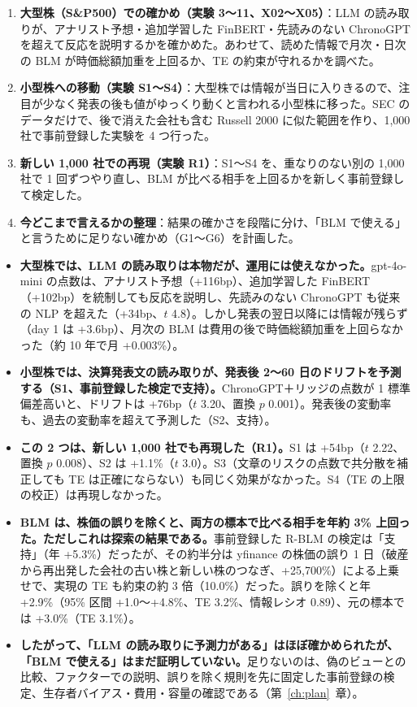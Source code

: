 \documentclass[xelatex,ja=standard,jafont=haranoaji,a4paper,10pt]{bxjsreport}
\newcommand{\SP}{S\&P500}
\newcommand{\chapref}[1]{第~\ref{#1}~章}
\begin{document}
\begin{enumerate}
\item \textbf{大型株（\SP{}）での確かめ（実験 3〜11、X02〜X05）}：LLM の読み取りが、アナリスト予想・追加学習した FinBERT・先読みのない ChronoGPT を超えて反応を説明するかを確かめた。あわせて、読めた情報で月次・日次の BLM が時価総額加重を上回るか、TE の約束が守れるかを調べた。
\item \textbf{小型株への移動（実験 S1〜S4）}：大型株では情報が当日に入りきるので、注目が少なく発表の後も値がゆっくり動くと言われる小型株に移った。SEC のデータだけで、後で消えた会社も含む Russell 2000 に似た範囲を作り、1,000 社で事前登録した実験を 4 つ行った。
\item \textbf{新しい 1,000 社での再現（実験 R1）}：S1〜S4 を、重なりのない別の 1,000 社で 1 回ずつやり直し、BLM が比べる相手を上回るかを新しく事前登録して検定した。
\item \textbf{今どこまで言えるかの整理}：結果の確かさを段階に分け、「BLM で使える」と言うために足りない確かめ（G1〜G6）を計画した。
\end{enumerate}

\begin{keybox}[本書の主な結論]
\begin{itemize}
\item \textbf{大型株では、LLM の読み取りは本物だが、運用には使えなかった。}gpt-4o-mini の点数は、アナリスト予想（+116bp）、追加学習した FinBERT（+102bp）を統制しても反応を説明し、先読みのない ChronoGPT も従来の NLP を超えた（+34bp、$t$ 4.8）。しかし発表の翌日以降には情報が残らず（day 1 は +3.6bp）、月次の BLM は費用の後で時価総額加重を上回らなかった（約 10 年で月 +0.003\%）。
\item \textbf{小型株では、決算発表文の読み取りが、発表後 2〜60 日のドリフトを予測する（S1、事前登録した検定で支持）。}ChronoGPT＋リッジの点数が 1 標準偏差高いと、ドリフトは +76bp（$t$ 3.20、置換 $p$ 0.001）。発表後の変動率も、過去の変動率を超えて予測した（S2、支持）。
\item \textbf{この 2 つは、新しい 1,000 社でも再現した（R1）。}S1 は +54bp（$t$ 2.22、置換 $p$ 0.008）、S2 は +1.1\%（$t$ 3.0）。S3（文章のリスクの点数で共分散を補正しても TE は正確にならない）も同じく効果がなかった。S4（TE の上限の校正）は再現しなかった。
\item \textbf{BLM は、株価の誤りを除くと、両方の標本で比べる相手を年約 3\% 上回った。ただしこれは探索の結果である。}事前登録した R-BLM の検定は「支持」（年 +5.3\%）だったが、その約半分は yfinance の株価の誤り 1 日（破産から再出発した会社の古い株と新しい株のつなぎ、+25,700\%）による上乗せで、実現の TE も約束の約 3 倍（10.0\%）だった。誤りを除くと年 +2.9\%（95\% 区間 +1.0〜+4.8\%、TE 3.2\%、情報レシオ 0.89）、元の標本では +3.0\%（TE 3.1\%）。
\item \textbf{したがって、「LLM の読み取りに予測力がある」はほぼ確かめられたが、「BLM で使える」はまだ証明していない。}足りないのは、偽のビューとの比較、ファクターでの説明、誤りを除く規則を先に固定した事前登録の検定、生存者バイアス・費用・容量の確認である（\chapref{ch:plan}）。
\end{itemize}
\end{keybox}
\end{document}
